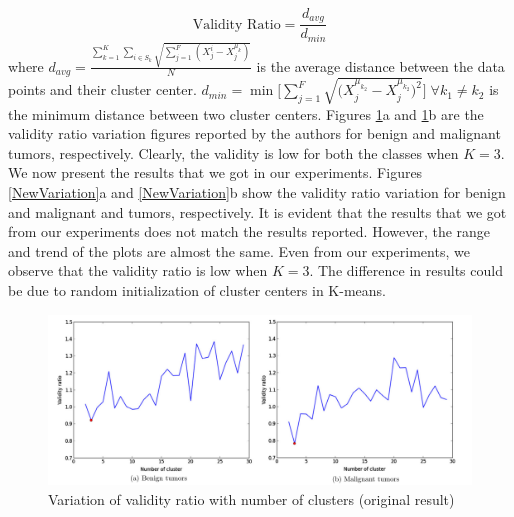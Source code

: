 \documentclass[twoside]{iitbreport}
\begin{document}
\begin{equation}\label{ValidityRatio}
\text{Validity Ratio} = \frac{d_{avg}}{d_{min}}
\end{equation}
where $d_{avg} = \tfrac{\sum_{k=1}^K \sum_{i \in S_k} \sqrt{\sum_{j=1}^F (X_j^i - X_j^{\mu_k})}}{N}$ is the average distance between the data points and their cluster center. $d_{min} = \min \bigg[\sum_{j=1}^F\sqrt{\big(X_j^{\mu_{k_2}} - X_j^{\mu_{k_2}}\big)^2}\bigg] \; \forall k_1 \neq k_2$ is the minimum distance between two cluster centers. Figures \ref{OriginalVariation}a and \ref{OriginalVariation}b are the validity ratio variation figures reported by the authors for benign and malignant tumors, respectively. Clearly, the validity is low for both the classes when $K = 3$. We now present the results that we got in our experiments. Figures \ref{NewVariation}a and \ref{NewVariation}b show the validity ratio variation for benign and malignant and tumors, respectively. It is evident that the results that we got from our experiments does not match the results reported. However, the range and trend of the plots are almost the same. Even from our experiments, we observe that the validity ratio is low when $K = 3$. The difference in results could be due to random initialization of cluster centers in K-means.

\begin{figure}[H]
  \begin{center}
    \includegraphics[scale=0.27]{Figures/BenignMalignantOriginal}
  \end{center}
  \caption{Variation of validity ratio with number of clusters (original result)}
  \label{OriginalVariation}
\end{figure}
\end{document}

